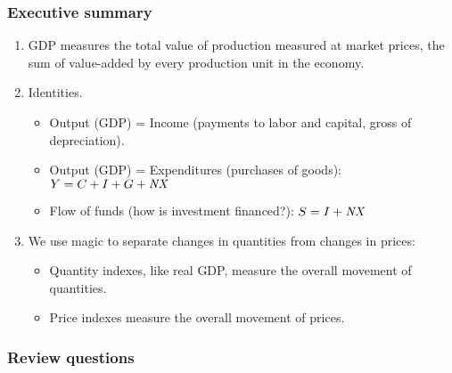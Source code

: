 \documentclass[12pt,letterpaper]{article}
\newcommand{\NX}{\mbox{\em NX\/}}
\begin{document}
\subsubsection*{Executive summary}

\begin{enumerate}
\item GDP measures the total value of production measured at market prices,
the sum of value-added by every production unit in the economy.

\item Identities.

   \begin{itemize}

   \item Output (GDP) = Income (payments to labor and capital,
   gross of depreciation).

   \item Output (GDP) = Expenditures (purchases of goods):  $Y = C+I+G+\NX$

   \item Flow of funds (how is investment financed?):  $S =I + \NX$

   \end{itemize}

\item We use magic to separate changes in quantities from changes in prices:
\begin{itemize}
\item Quantity indexes, like real GDP, measure the overall movement of quantities.
\item Price indexes measure the overall movement of prices.
\end{itemize}

\end{enumerate}


\subsubsection*{Review questions}
\end{document}
